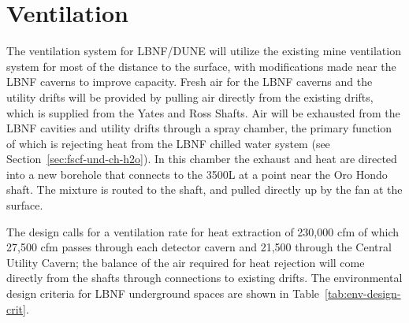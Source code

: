 \section{Ventilation}
\label{sec:fscf-und-vent}

The ventilation system for LBNF/DUNE will utilize the existing mine ventilation system for most of the distance to the surface, with modifications made near the LBNF caverns to improve capacity. Fresh air for the LBNF caverns and the utility drifts will be provided by pulling air directly from the existing drifts, which is supplied from the Yates and Ross Shafts. 
%
Air will be exhausted from the LBNF cavities and utility drifts through a spray chamber, the primary function of which is rejecting heat from the LBNF chilled water system (see Section~\ref{sec:fscf-und-ch-h2o}). In this chamber 
the exhaust and heat are directed into a new borehole that connects to the 3500L at a point near the Oro Hondo shaft. The mixture is routed to the shaft, and pulled directly up by the fan at the surface.

The design calls for a ventilation rate for heat extraction of 230,000 cfm 
of which  27,500 cfm passes through each detector cavern and 21,500 through the Central Utility Cavern; the balance of the air required for heat rejection will come directly from the shafts through connections to existing drifts. The environmental design criteria for LBNF underground spaces are shown in Table~\ref{tab:env-design-crit}.

